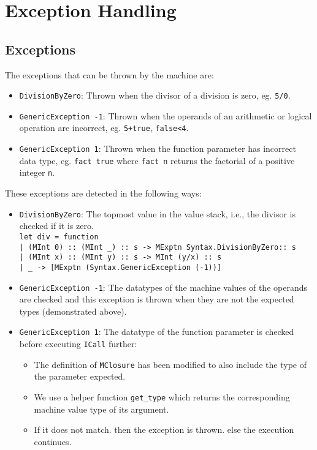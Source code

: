 \documentclass{article}
\begin{document}
\newpage
\section{Exception Handling}
    \subsection{Exceptions}
        The exceptions that can be thrown by the machine are:
        \begin{itemize}
            \item \texttt{DivisionByZero}: Thrown when the divisor of a division is zero, eg. \texttt{5/0}.
            \item \texttt{GenericException -1}: Thrown when the operands of an arithmetic or logical operation are incorrect, eg. \texttt{5+true}, \texttt{false<4}.
            \item \texttt{GenericException 1}: Thrown when the function parameter has incorrect data type, eg. \texttt{fact true} where \texttt{fact n} returns the factorial of a positive integer \texttt{n}.
        \end{itemize}

        These exceptions are detected in the following ways:
        \begin{itemize}
            \item \texttt{DivisionByZero}: The topmost value in the value stack, i.e., the divisor is checked if it is zero.\\\texttt{let div = function\\| (MInt 0) :: (MInt \_) :: s -> MExptn Syntax.DivisionByZero:: s\\| (MInt x) :: (MInt y) :: s ->  MInt (y/x) :: s\\| \_ -> [MExptn (Syntax.GenericException (-1))]}
            \item \texttt{GenericException -1}: The datatypes of the machine values of the operands are checked and this exception is thrown when they are not the expected types (demonstrated above).
            \item \texttt{GenericException 1}: The datatype of the function parameter is checked before executing \texttt{ICall} further:
                \begin{itemize}
                    \item The definition of \texttt{MClosure} has been modified to also include the type of the parameter expected.
                    \item We use a helper function \texttt{get\_type} which returns the corresponding machine value type of its argument.
                    \item If it does not match. then the exception is thrown. else the execution continues.
                \end{itemize} 
        \end{itemize}
\end{document}
